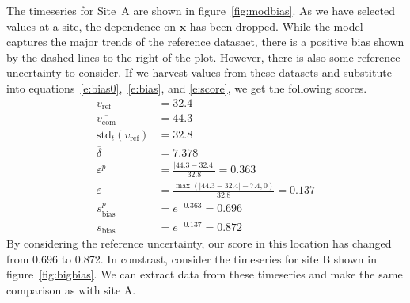 \documentclass{agujournal}
\newcommand{\bx}{\mathbf{x}}
\begin{document}
The timeseries for Site~A are shown in figure~\ref{fig:modbias}. As we have selected values at a site, the dependence on $\bx$ has been dropped. While the model captures the major trends of the reference datasaet, there is a positive bias shown by the dashed lines to the right of the plot. However, there is also some reference uncertainty to consider. If we harvest values from these datasets and substitute into equations~\eqref{e:bias0},~\eqref{e:bias}, and \eqref{e:score}, we get the following scores.
%
\begin{subequations}
	\label{e:biasA}
	\begin{align}
		\overline{v_{\mathrm{ref}}}                 & = 32.4                                                           \\
		\overline{v_{\mathrm{com}}}                 & = 44.3                                                           \\
		\mathrm{std}_t\left(v_{\mathrm{ref}}\right) & = 32.8                                                           \\
		\overline{\delta}                           & = 7.378                                                          \\
		\varepsilon^{p}                             & = \frac{\left| 44.3 - 32.4 \right|}{32.8}                = 0.363 \\
		\varepsilon                                 & = \frac{\max(\left| 44.3 - 32.4 \right| - 7.4,0)}{32.8}  = 0.137 \\
		s^{p}_{\mathrm{bias}}                       & = e^{-0.363} = 0.696                                             \\
		s_{\mathrm{bias}}                           & = e^{-0.137} = 0.872
	\end{align}
\end{subequations}
%
By considering the reference uncertainty, our score in this location has changed from 0.696 to 0.872. In constrast, consider the timeseries for site B shown in figure~\ref{fig:bigbias}. We can extract data from these timeseries and make the same comparison as with site A.
%
\end{document}
